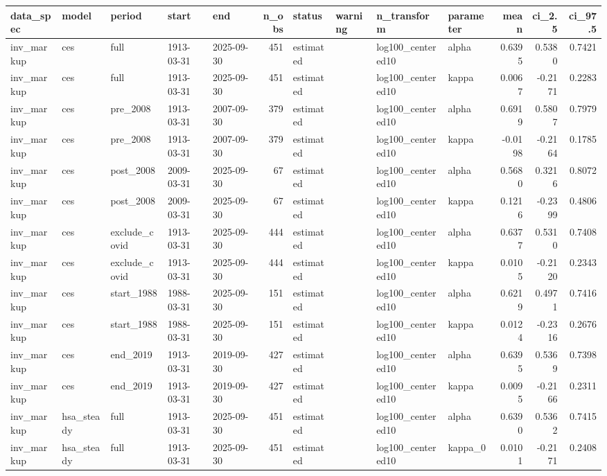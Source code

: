\begin{tabular}{lllllrllllrrr}
\toprule
data\_spec & model & period & start & end & n\_obs & status & warning & n\_transform & parameter & mean & ci\_2.5 & ci\_97.5 \\
\midrule
inv\_markup & ces & full & 1913-03-31 & 2025-09-30 & 451 & estimated &  & log100\_centered10 & alpha & 0.6395 & 0.5380 & 0.7421 \\
inv\_markup & ces & full & 1913-03-31 & 2025-09-30 & 451 & estimated &  & log100\_centered10 & kappa & 0.0067 & -0.2171 & 0.2283 \\
inv\_markup & ces & pre\_2008 & 1913-03-31 & 2007-09-30 & 379 & estimated &  & log100\_centered10 & alpha & 0.6919 & 0.5807 & 0.7979 \\
inv\_markup & ces & pre\_2008 & 1913-03-31 & 2007-09-30 & 379 & estimated &  & log100\_centered10 & kappa & -0.0198 & -0.2164 & 0.1785 \\
inv\_markup & ces & post\_2008 & 2009-03-31 & 2025-09-30 & 67 & estimated &  & log100\_centered10 & alpha & 0.5680 & 0.3216 & 0.8072 \\
inv\_markup & ces & post\_2008 & 2009-03-31 & 2025-09-30 & 67 & estimated &  & log100\_centered10 & kappa & 0.1216 & -0.2399 & 0.4806 \\
inv\_markup & ces & exclude\_covid & 1913-03-31 & 2025-09-30 & 444 & estimated &  & log100\_centered10 & alpha & 0.6377 & 0.5310 & 0.7408 \\
inv\_markup & ces & exclude\_covid & 1913-03-31 & 2025-09-30 & 444 & estimated &  & log100\_centered10 & kappa & 0.0105 & -0.2120 & 0.2343 \\
inv\_markup & ces & start\_1988 & 1988-03-31 & 2025-09-30 & 151 & estimated &  & log100\_centered10 & alpha & 0.6219 & 0.4971 & 0.7416 \\
inv\_markup & ces & start\_1988 & 1988-03-31 & 2025-09-30 & 151 & estimated &  & log100\_centered10 & kappa & 0.0124 & -0.2316 & 0.2676 \\
inv\_markup & ces & end\_2019 & 1913-03-31 & 2019-09-30 & 427 & estimated &  & log100\_centered10 & alpha & 0.6395 & 0.5369 & 0.7398 \\
inv\_markup & ces & end\_2019 & 1913-03-31 & 2019-09-30 & 427 & estimated &  & log100\_centered10 & kappa & 0.0095 & -0.2166 & 0.2311 \\
inv\_markup & hsa\_steady & full & 1913-03-31 & 2025-09-30 & 451 & estimated &  & log100\_centered10 & alpha & 0.6390 & 0.5362 & 0.7415 \\
inv\_markup & hsa\_steady & full & 1913-03-31 & 2025-09-30 & 451 & estimated &  & log100\_centered10 & kappa\_0 & 0.0101 & -0.2171 & 0.2408 \\

\end{tabular}
